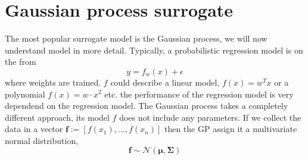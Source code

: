 \section{Gaussian process surrogate}

The most popular surrogate model is the Gaussian process, we will now understand model
in more detail. Typically, a probabilistic regression model is on the from 
$$y = f_w(x) + \epsilon$$
where weights are trained. $f$ could describe a linear model, $f(x) = w^Tx$ or a polynomial
$f(x) = w\cdot x^2$ etc. the performance of the regression model is very dependend on the 
regression model. The Gaussian process takes a completely different approach, its model $f$ does not
include any parameters. If we collect the data in a vector $\textbf{f} := [f(x_1),\dots,f(x_n)]$
then the GP assign it a multivariate normal distribution, 
$$\textbf{f} \sim \mathcal{N}(\bm{\mu}, \bm{\Sigma})$$

